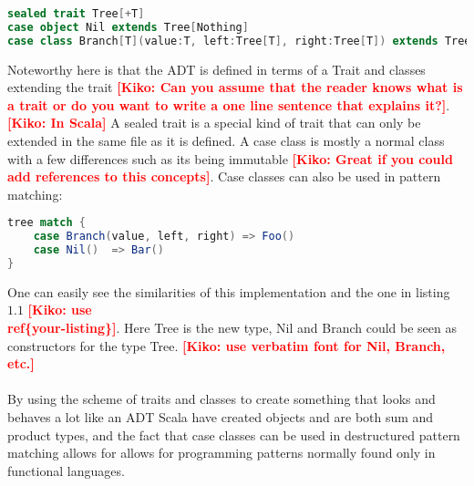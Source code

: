 \documentclass[10pt]{report}
\newcommand{\KIKO}[1]{\textcolor{red}{\textbf{[Kiko: #1]}}}
\begin{document}
\begin{lstlisting}[language=Scala,caption={ADT definition in Scala},label={lst:e4c_syntax}]
sealed trait Tree[+T]
case object Nil extends Tree[Nothing]
case class Branch[T](value:T, left:Tree[T], right:Tree[T]) extends Tree[T]
\end{lstlisting}
Noteworthy here is that the ADT is defined in terms of a Trait and classes extending the trait \KIKO{Can you assume that the reader knows what is a trait or do you want to write a one line sentence that explains it?}. \KIKO{In Scala} A sealed trait is a special kind of trait that can only be extended in the same file as it is defined.  A case class is mostly a normal class with a few differences such as its being immutable \KIKO{Great if you could add references to this concepts}.  Case classes can also be used in pattern matching:
\begin{lstlisting}[language=Scala,caption={Pattern matching on an ADT in Scala}]
tree match {
    case Branch(value, left, right) => Foo()
    case Nil()  => Bar()
}
\end{lstlisting}
One can easily see the similarities of this implementation and the one in listing $1.1$ \KIKO{use \\ref\{your-listing\}}. Here Tree is the new type, Nil and Branch could be seen as constructors for the type Tree. \KIKO{use verbatim font for Nil, Branch, etc.}
\\
\\
By using the scheme of traits and classes to create something that looks and behaves a lot like an ADT Scala have created objects and are both sum and product types, and the fact that case classes can be used in destructured pattern matching allows for allows for programming patterns normally found only in functional languages.
\end{document}
